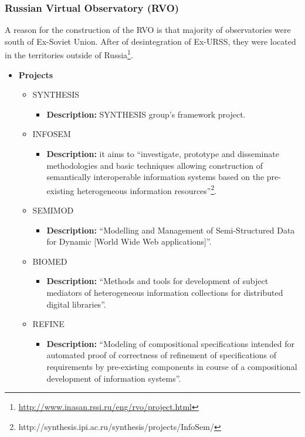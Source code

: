 \subsubsection{Russian Virtual Observatory (RVO)}
A reason for the construction of the RVO \cite{website:rvo-home} is that
majority of observatories were south of Ex-Soviet Union. After of desintegration
of Ex-URSS, they were located in the territories outside of
Russia\footnote{\url{http://www.inasan.rssi.ru/eng/rvo/project.html}}.

\begin{itemize}
\item
\textbf{Projects}
\begin{itemize}
\item SYNTHESIS
\begin{itemize}
\item \textbf{Description:} SYNTHESIS group's framework project.
\end{itemize}
\item INFOSEM
\begin{itemize}
\item \textbf{Description:} it aims to ``investigate, prototype and disseminate
methodologies and basic techniques allowing construction of semantically
interoperable information systems based on the pre-existing heterogeneous
information
resources''\footnote{http://synthesis.ipi.ac.ru/synthesis/projects/InfoSem/}.
\end{itemize}
\item SEMIMOD
\begin{itemize}
\item \textbf{Description:} ``Modelling and Management of Semi-Structured Data
for Dynamic [World Wide Web applications]''.
\end{itemize}
\item BIOMED
\begin{itemize}
\item \textbf{Description:} ``Methods and tools for development of subject
mediators of he\-te\-ro\-ge\-neous information collections for distributed
digital libraries''.
\end{itemize}
\item REFINE
\begin{itemize}
\item \textbf{Description:} ``Modeling of compositional specifications intended
for automated proof of correctness of refinement of specifications of
requirements by pre-existing components in course of a compositional development
of information systems''.

\end{itemize}
\end{itemize}
\end{itemize}
